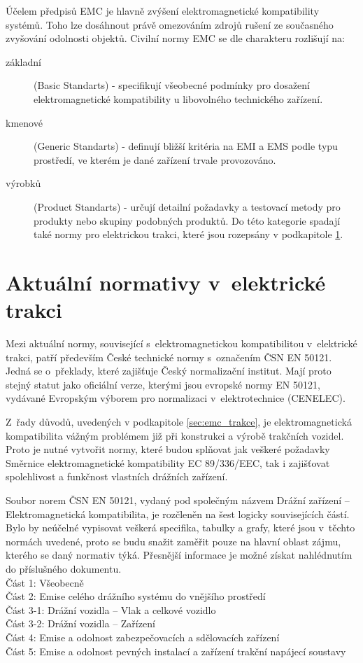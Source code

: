 Účelem předpisů EMC je hlavně zvýšení elektromagnetické kompatibility systémů. Toho lze dosáhnout právě omezováním zdrojů rušení ze současného zvyšování odolnosti objektů. Civilní normy EMC se dle charakteru rozlišují na:
\begin{description}
\item[základní] (Basic Standarts) - specifikují všeobecné podmínky pro dosažení elektromagnetické kompatibility u libovolného technického zařízení.
\item[kmenové] (Generic Standarts) - definují bližší kritéria na EMI a EMS podle typu prostředí, ve kterém je dané zařízení trvale provozováno.
\item[výrobků] (Product Standarts) - určují detailní požadavky a testovací metody pro produkty nebo skupiny podobných produktů. Do této kategorie spadají také normy pro elektrickou trakci, které jsou rozepsány v podkapitole \ref{sec:emc_normy_trakce}.
\end{description}
\newpage

\section{Aktuální normativy v~elektrické trakci} \label{sec:emc_normy_trakce}
Mezi aktuální normy, související s~elektromagnetickou kompatibilitou v~elektrické trakci, patří především České technické normy s~označením ČSN EN 50121. Jedná se o~překlady, které zajišťuje Český normalizační institut. Mají proto stejný statut jako oficiální verze, kterými jsou evropské normy EN 50121, vydávané Evropským výborem pro normalizaci v~elektrotechnice (CENELEC). 

 Z~řady důvodů, uvedených v podkapitole \ref{sec:emc_trakce},  je elektromagnetická kompatibilita vážným problémem již při konstrukci a výrobě trakčních vozidel. Proto je nutné vytvořit normy, které budou splňovat jak veškeré požadavky Směrnice elektromagnetické kompatibility EC 89/336/EEC, tak i zajišťovat spolehlivost a funkčnost vlastních drážních zařízení.

Soubor norem ČSN EN 50121, vydaný pod společným názvem Drážní zařízení – Elektromagnetická kompatibilita, je rozčleněn na šest logicky souvisejících částí. Bylo by neúčelné vypisovat veškerá specifika, tabulky a grafy, které jsou v~těchto normách uvedené, proto se budu snažit zaměřit pouze na hlavní oblast zájmu, kterého se daný normativ týká. Přesnější informace je možné získat nahlédnutím do příslušného dokumentu. \bigskip \\
Část 1: Všeobecně\\
Část 2: Emise celého drážního  systému do vnějšího prostředí\\
Část 3-1: Drážní vozidla – Vlak a celkové vozidlo\\
Část 3-2: Drážní vozidla – Zařízení\\
Část 4: Emise a odolnost zabezpečovacích a sdělovacích zařízení\\
Část 5: Emise a odolnost pevných instalací a zařízení trakční napájecí soustavy\\


